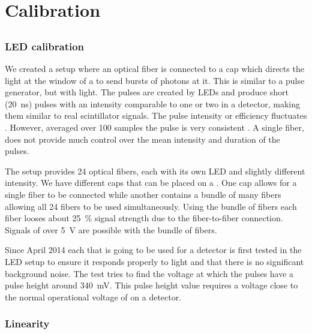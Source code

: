 \chapter{Calibration}
\label{ch:calibration}

\section{\pmt}
\label{sec:pmt}


\subsection{LED calibration}
\label{sub:led_calibration}

We created a setup where an optical fiber is connected to a cap which
directs the light at the window of a \pmt to send bursts of photons at
it. This is similar to a pulse generator, but with light. The pulses are
created by LEDs and produce short (\SI{20}{\nano\second}) pulses with an
intensity comparable to one or two \mips in a detector, making them
similar to real scintillator signals. The pulse intensity or efficiency
fluctuates . However,
averaged over 100 samples the pulse is very consistent
. A single fiber,
does not provide much control over the mean intensity and duration of
the pulses.

The setup provides 24 optical fibers, each with its own LED and slightly
different intensity. We have different caps that can be placed on a
\pmt. One cap allows for a single fiber to be connected while another
contains a bundle of many fibers allowing all 24 fibers to be used
simultaneously. Using the bundle of fibers each fiber looses about
\SI{25}{\percent} signal strength due to the fiber-to-fiber connection.
Signals of over \SI{5}{\volt} are possible with the bundle of fibers.

Since April 2014 each \pmt that is going to be used for a \hisparc
detector is first tested in the LED setup to ensure it responds properly
to light and that there is no significant background noise. The test
tries to find the voltage at which the pulses have a pulse height around
\SI{340}{\milli\volt}. This pulse height value requires a voltage close
to the normal operational voltage of \pmts on a \hisparc detector.


\subsection{Linearity}

